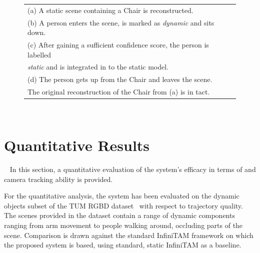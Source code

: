 \begin{figure}[!htbp]
{\begin{tabular}[t]{@{}l@{}}
      (a) A static scene containing a Chair is reconstructed.\\
      (b) A person enters the scene, is marked as \textit{dynamic} and sits down.\\
      (c) After gaining a sufficient confidence score, the person is labelled\\
      \textit{static} and is integrated in to the static model.\\
      (d) The person gets up from the Chair and leaves the scene.\\ The original
      reconstruction of the Chair from (a) is in tact.
    \end{tabular}
  }
~\label{figure:moseg_qualitative_chair}
\end{figure}

\section{Quantitative Results}
~\label{sec:moseg_quantitative}
In this section, a quantitative evaluation of the system's efficacy in terms of
and camera tracking ability is provided.

For the quantitative analysis, the system has been evaluated on the dynamic
objects subset of the TUM RGBD dataset~\cite{Sturm2012} with respect to
trajectory quality. The scenes provided in the dataset contain a range of
dynamic components ranging from arm movement to people walking around, occluding
parts of the scene. Comparison is drawn against the standard InfiniTAM framework
on which the proposed system is based, using standard, static InfiniTAM as a
baseline.

